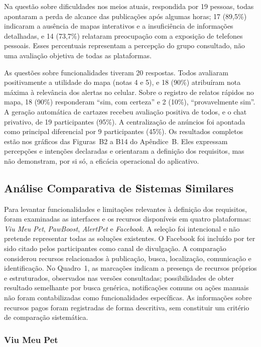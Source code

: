Na questão sobre dificuldades nos meios atuais, respondida por 19 pessoas, todas apontaram a perda de alcance das publicações após algumas horas; 17 (89,5\%) indicaram a ausência de mapas interativos e a insuficiência de informações detalhadas, e 14 (73,7\%) relataram preocupação com a exposição de telefones pessoais. Esses percentuais representam a percepção do grupo consultado, não uma avaliação objetiva de todas as plataformas.

As questões sobre funcionalidades tiveram 20 respostas. Todos avaliaram positivamente a utilidade do mapa (notas 4 e 5), e 18 (90\%) atribuíram nota máxima à relevância dos alertas no celular. Sobre o registro de relatos rápidos no mapa, 18 (90\%) responderam ``sim, com certeza'' e 2 (10\%), ``provavelmente sim''. A geração automática de cartazes recebeu avaliação positiva de todos, e o chat privativo, de 19 participantes (95\%). A centralização de anúncios foi apontada como principal diferencial por 9 participantes (45\%). Os resultados completos estão nos gráficos das Figuras~B2 a B14 do Apêndice~B. Eles expressam percepções e intenções declaradas e orientaram a definição dos requisitos, mas não demonstram, por si só, a eficácia operacional do aplicativo.

\subsection{Análise Comparativa de Sistemas Similares}

Para levantar funcionalidades e limitações relevantes à definição dos requisitos, foram examinadas as interfaces e os recursos disponíveis em quatro plataformas: \textit{Viu Meu Pet}, \textit{PawBoost}, \textit{AlertPet} e \textit{Facebook}. A seleção foi intencional e não pretende representar todas as soluções existentes. O Facebook foi incluído por ter sido citado pelos participantes como canal de divulgação. A comparação considerou recursos relacionados à publicação, busca, localização, comunicação e identificação. No Quadro~1, as marcações indicam a presença de recursos próprios e estruturados, observados nas versões consultadas; possibilidades de obter resultado semelhante por busca genérica, notificações comuns ou ações manuais não foram contabilizadas como funcionalidades específicas. As informações sobre recursos pagos foram registradas de forma descritiva, sem constituir um critério de comparação sistemática.


\subsubsection{Viu Meu Pet}

